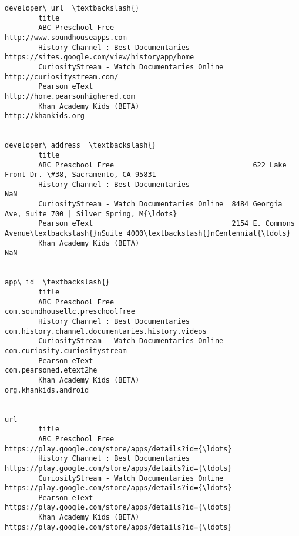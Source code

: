 \documentclass[11pt]{article}
\begin{document}
\begin{Verbatim}[commandchars=\\\{\}]
                                                                                      developer\_url  \textbackslash{}
        title                                                                                         
        ABC Preschool Free                                            http://www.soundhouseapps.com   
        History Channel : Best Documentaries          https://sites.google.com/view/historyapp/home   
        CuriosityStream - Watch Documentaries Online                    http://curiositystream.com/   
        Pearson eText                                               http://home.pearsonhighered.com   
        Khan Academy Kids (BETA)                                                http://khankids.org   
        
                                                                                      developer\_address  \textbackslash{}
        title                                                                                             
        ABC Preschool Free                                 622 Lake Front Dr. \#38, Sacramento, CA 95831   
        History Channel : Best Documentaries                                                        NaN   
        CuriosityStream - Watch Documentaries Online  8484 Georgia Ave, Suite 700 | Silver Spring, M{\ldots}   
        Pearson eText                                 2154 E. Commons Avenue\textbackslash{}nSuite 4000\textbackslash{}nCentennial{\ldots}   
        Khan Academy Kids (BETA)                                                                    NaN   
        
                                                                                                app\_id  \textbackslash{}
        title                                                                                            
        ABC Preschool Free                                             com.soundhousellc.preschoolfree   
        History Channel : Best Documentaries          com.history.channel.documentaries.history.videos   
        CuriosityStream - Watch Documentaries Online                     com.curiosity.curiositystream   
        Pearson eText                                                           com.pearsoned.etext2he   
        Khan Academy Kids (BETA)                                                  org.khankids.android   
        
                                                                                                    url  
        title                                                                                            
        ABC Preschool Free                            https://play.google.com/store/apps/details?id={\ldots}  
        History Channel : Best Documentaries          https://play.google.com/store/apps/details?id={\ldots}  
        CuriosityStream - Watch Documentaries Online  https://play.google.com/store/apps/details?id={\ldots}  
        Pearson eText                                 https://play.google.com/store/apps/details?id={\ldots}  
        Khan Academy Kids (BETA)                      https://play.google.com/store/apps/details?id={\ldots}  
        

\end{Verbatim}
\end{document}
